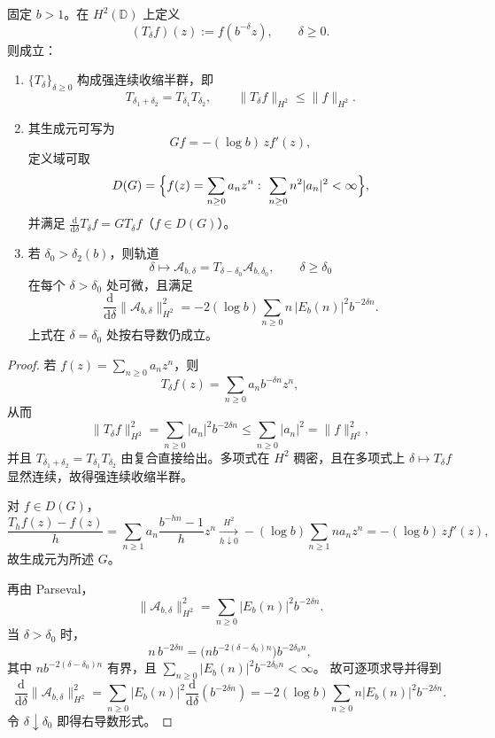 \begin{theorem}[阻尼参数的重整化半群与能量耗散恒等式]\label{thm:abel-damping-semigroup-dissipation}
固定 \(b>1\)。在 \(H^2(\mathbb D)\) 上定义
\[
(T_\delta f)(z):=f(b^{-\delta}z),\qquad \delta\ge 0.
\]
则成立：
\begin{enumerate}
\item \(\{T_\delta\}_{\delta\ge 0}\) 构成强连续收缩半群，即
\[
T_{\delta_1+\delta_2}=T_{\delta_1}T_{\delta_2},\qquad
\|T_\delta f\|_{H^2}\le \|f\|_{H^2}.
\]
\item 其生成元可写为
\[
Gf=-(\log b)\,z f'(z),
\]
定义域可取
\[
D(G)=\Bigl\{f(z)=\sum_{n\ge 0}a_n z^n:\ \sum_{n\ge 0}n^2|a_n|^2<\infty\Bigr\},
\]
并满足 \(\frac{\mathrm d}{\mathrm d\delta}T_\delta f=GT_\delta f\)（\(f\in D(G)\)）。
\item 若 \(\delta_0>\delta_2(b)\)，则轨道
\[
\delta\mapsto \mathcal A_{b,\delta}
=T_{\delta-\delta_0}\mathcal A_{b,\delta_0},
\qquad \delta\ge \delta_0
\]
在每个 \(\delta>\delta_0\) 处可微，且满足
\[
\frac{\mathrm d}{\mathrm d\delta}\|\mathcal A_{b,\delta}\|_{H^2}^2
=-2(\log b)\sum_{n\ge 0}n\,|E_b(n)|^2b^{-2\delta n}.
\]
上式在 \(\delta=\delta_0\) 处按右导数仍成立。
\end{enumerate}
\end{theorem}
\begin{proof}
若 \(f(z)=\sum_{n\ge 0}a_n z^n\)，则
\[
T_\delta f(z)=\sum_{n\ge 0}a_n b^{-\delta n}z^n,
\]
从而
\[
\|T_\delta f\|_{H^2}^2=\sum_{n\ge 0}|a_n|^2b^{-2\delta n}\le \sum_{n\ge 0}|a_n|^2=\|f\|_{H^2}^2,
\]
并且 \(T_{\delta_1+\delta_2}=T_{\delta_1}T_{\delta_2}\) 由复合直接给出。多项式在 \(H^2\) 稠密，且在多项式上 \(\delta\mapsto T_\delta f\) 显然连续，故得强连续收缩半群。

对 \(f\in D(G)\)，
\[
\frac{T_h f(z)-f(z)}{h}
=\sum_{n\ge 1}a_n\frac{b^{-hn}-1}{h}z^n
\xrightarrow[h\downarrow 0]{H^2}
-(\log b)\sum_{n\ge 1}n a_n z^n
=-(\log b)\,z f'(z),
\]
故生成元为所述 \(G\)。

再由 Parseval，
\[
\|\mathcal A_{b,\delta}\|_{H^2}^2
=\sum_{n\ge 0}|E_b(n)|^2b^{-2\delta n}.
\]
当 \(\delta>\delta_0\) 时，
\[
n\,b^{-2\delta n}
=\bigl(n b^{-2(\delta-\delta_0)n}\bigr)b^{-2\delta_0 n},
\]
其中 \(n b^{-2(\delta-\delta_0)n}\) 有界，且
\(\sum_{n\ge 0}|E_b(n)|^2b^{-2\delta_0 n}<\infty\)。
故可逐项求导并得到
\[
\frac{\mathrm d}{\mathrm d\delta}\|\mathcal A_{b,\delta}\|_{H^2}^2
=\sum_{n\ge 0}|E_b(n)|^2\frac{\mathrm d}{\mathrm d\delta}(b^{-2\delta n})
=-2(\log b)\sum_{n\ge 0}n|E_b(n)|^2b^{-2\delta n}.
\]
令 \(\delta\downarrow \delta_0\) 即得右导数形式。
\end{proof}

